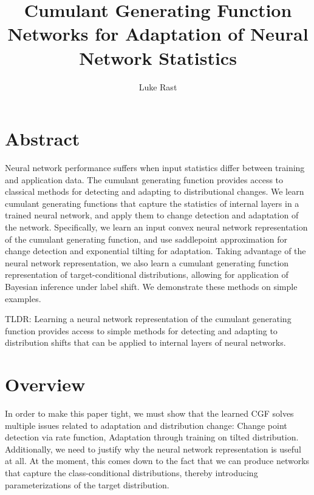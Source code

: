 \documentclass[11pt]{article}      %
\begin{document}
\title{Cumulant Generating Function Networks for Adaptation of Neural Network Statistics}
\author{Luke Rast}
\maketitle

\doublespacing
\linenumbers


\section{Abstract}

Neural network performance suffers when input statistics differ between training and application data.
The cumulant generating function provides access to classical methods for detecting and adapting to distributional changes.
We learn cumulant generating functions that capture the statistics of internal layers in a trained neural network, and apply them to change detection and adaptation of the network.
Specifically, we learn an input convex neural network representation of the cumulant generating function, and use saddlepoint approximation for change detection and exponential tilting for adaptation.
Taking advantage of the neural network representation, we also learn a cumulant generating function representation of target-conditional distributions, allowing for application of Bayesian inference under label shift.
We demonstrate these methods on simple examples.



TLDR: Learning a neural network representation of the cumulant generating function provides access to simple methods for detecting and adapting to distribution shifts that can be applied to internal layers of neural networks.



\section{Overview}

In order to make this paper tight, we must show that the learned CGF solves multiple issues related to adaptation and distribution change: Change point detection via rate function, Adaptation through training on tilted distribution.
Additionally, we need to justify why the neural network representation is useful at all.
At the moment, this comes down to the fact that we can produce networks that capture the class-conditional distributions, thereby introducing parameterizations of the target distribution.
\end{document}
